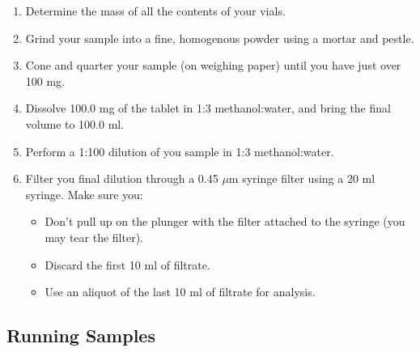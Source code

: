 \documentclass[]{tufte-book}
\providecommand{\tightlist}{%
  \setlength{\itemsep}{0pt}\setlength{\parskip}{0pt}}
\begin{document}
\begin{enumerate}
\def\labelenumi{\arabic{enumi}.}
\tightlist
\item
  Determine the mass of all the contents of your vials.
\item
  Grind your sample into a fine, homogenous powder using a mortar and pestle.
\item
  Cone and quarter your sample (on weighing paper) until you have just over 100 mg.
\item
  Dissolve 100.0 mg of the tablet in 1:3 methanol:water, and bring the final volume to 100.0 ml.
\item
  Perform a 1:100 dilution of you sample in 1:3 methanol:water.
\item
  Filter you final dilution through a 0.45 \(\mu\)m syringe filter using a 20 ml syringe. Make sure you:

  \begin{itemize}
  \tightlist
  \item
    Don't pull up on the plunger with the filter attached to the syringe (you may tear the filter).
  \item
    Discard the first 10 ml of filtrate.
  \item
    Use an aliquot of the last 10 ml of filtrate for analysis.
  \end{itemize}
\end{enumerate}

\hypertarget{running-samples-2}{%
\subsection{Running Samples}\label{running-samples-2}}
\end{document}
